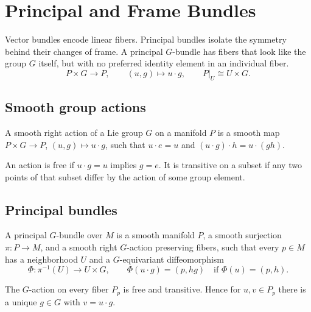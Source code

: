 \chapter{Principal and Frame Bundles}
\label{ch:vii08-principal-and-frame-bundles}

Vector bundles encode linear fibers. Principal bundles isolate the symmetry behind their changes of frame. A principal \(G\)-bundle has fibers that look like the group \(G\) itself, but with no preferred identity element in an individual fiber.
\[
\boxed{P\times G\to P,\qquad (u,g)\mapsto u\cdot g,\qquad
P|_U\cong U\times G.}
\]

\section{Smooth group actions}
\begin{definition}\label{def:vii08-right-action}
A smooth right action of a Lie group \(G\) on a manifold \(P\) is a smooth map \(P\times G\to P\), \((u,g)\mapsto u\cdot g\), such that \(u\cdot e=u\) and \((u\cdot g)\cdot h=u\cdot(gh)\).
\end{definition}

\begin{definition}\label{def:vii08-free-transitive}
An action is free if \(u\cdot g=u\) implies \(g=e\). It is transitive on a subset if any two points of that subset differ by the action of some group element.
\end{definition}

\section{Principal bundles}
\begin{definition}\label{def:vii08-principal-bundle}
A principal \(G\)-bundle over \(M\) is a smooth manifold \(P\), a smooth surjection \(\pi:P\to M\), and a smooth right \(G\)-action preserving fibers, such that every \(p\in M\) has a neighborhood \(U\) and a \(G\)-equivariant diffeomorphism
\[
\Phi:\pi^{-1}(U)\to U\times G,
\qquad
\Phi(u\cdot g)=(p,hg)\quad\text{if }\Phi(u)=(p,h).
\]
\end{definition}

\begin{proposition}\label{prop:vii08-torsor}
The \(G\)-action on every fiber \(P_p\) is free and transitive. Hence for \(u,v\in P_p\) there is a unique \(g\in G\) with \(v=u\cdot g\).
\end{proposition}

